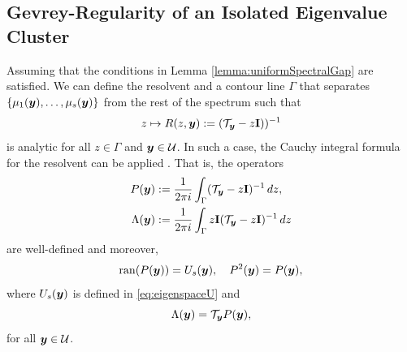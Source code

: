 \subsection{Gevrey-Regularity of an Isolated Eigenvalue Cluster}\label{subsec:clusterRegular}
Assuming that the conditions in Lemma \ref{lemma:uniformSpectralGap} are satisfied. We can define the resolvent and a contour line $\Gamma$ that separates $\{ \mu_1({\boldsymbol{y}}), \ldots, \mu_s({\boldsymbol{y}}) \}$ from the rest of the spectrum such that 
\begin{equation*}
    z \mapsto R(z,{\boldsymbol{y}}):= (\mathcal{T}_{\boldsymbol{y}}-z\mathbf{I}))^{-1}
\end{equation*} 
is analytic for all $z \in \Gamma$ and ${\boldsymbol{y}} \in \mathcal{U}$. 
In such a case, the Cauchy integral formula for the resolvent can be applied \cite[Chapter III, \S4 , Theorem 6.17]{kato1995perturbation}. 
That is, the operators
\begin{align}\label{eq:spectralProjector}
    P({\boldsymbol{y}}) &:= \frac 1 {2\pi i} \int_{\Gamma} (\mathcal{T}_{{\boldsymbol{y}}} -z \mathbf{I})^{-1}  \mathop{dz}, \\
    \label{eq:CauchyIntegralFormulaForD}
    \Lambda({\boldsymbol{y}}) &:=  \frac  1 {2\pi i} \int_{\Gamma} z \mathbf{I} (\mathcal{T}_{{\boldsymbol{y}}} - z \mathbf{I})^{-1}\mathop{dz}  
\end{align}
are well-defined and moreover, 
\begin{equation*}
    \mathrm{ran} (P({\boldsymbol{y}})) = U_s({\boldsymbol{y}}), \quad P^2({\boldsymbol{y}}) = P({\boldsymbol{y}}),
\end{equation*} where $U_s({\boldsymbol{y}})$ is defined in \eqref{eq:eigenspaceU} and 
\begin{equation*}
    \Lambda({\boldsymbol{y}}) =\mathcal{T}_{{\boldsymbol{y}}}P({\boldsymbol{y}}),
\end{equation*}
for all ${\boldsymbol{y}} \in \mathcal{U}$.

